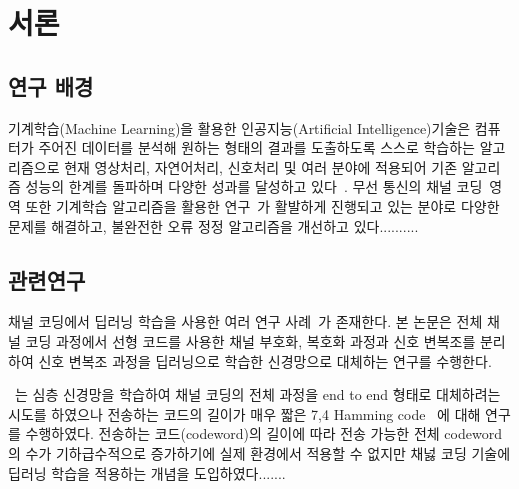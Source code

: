 \documentclass[11pt]{oblivoir}
\begin{document}

\makefrontcover
\myemptypage

\makefrontcover

\makeapproval

\tableofcontents
\listoffigures
\listoftables

\newpage

\section{\centering 서론}

\subsection{연구 배경}

기계학습(Machine Learning)을 활용한 인공지능(Artificial Intelligence)기술은 컴퓨터가 주어진 데이터를 분석해 원하는 형태의 결과를 도출하도록 스스로 학습하는 알고리즘으로 현재 영상처리, 자연어처리, 신호처리 및 여러 분야에 적용되어 기존 알고리즘 성능의 한계를 돌파하며 다양한 성과를 달성하고 있다~\cite{oshea--hoydis2017}. 무선 통신의 채널 코딩~\cite{faruque2016introduction}영역 또한 기계학습 알고리즘을 활용한 연구~\cite{Balevi--Andrews2020}가 활발하게 진행되고 있는 분야로 다양한 문제를 해결하고, 불완전한 오류 정정 알고리즘을 개선하고 있다..........

\subsection{관련연구}

채널 코딩에서 딥러닝 학습을 사용한 여러 연구 사례~\cite{oshea--hoydis2017,jiang--kim--asnani--kannan--oh--viswanath2020,kim2020,Shental2019,Koike-Akino--Wang--Millar--Kojima--Parsons2019}가 존재한다. 본 논문은 전체 채널 코딩 과정에서 선형 코드를 사용한 채널 부호화, 복호화 과정과 신호 변복조를 분리하여 신호 변복조 과정을 딥러닝으로 학습한 신경망으로 대체하는 연구를 수행한다.

~\cite{oshea--hoydis2017}는 심층 신경망을 학습하여 채널 코딩의 전체 과정을 end to end 형태로 대체하려는 시도를 하였으나 전송하는 코드의 길이가 매우 짧은 7,4 Hamming code~\cite{7955265} 에 대해 연구를 수행하였다. 전송하는 코드(codeword)의 길이에 따라 전송 가능한 전체 codeword의  수가 기하급수적으로 증가하기에 실제 환경에서 적용할 수 없지만 채넗 코딩 기술에 딥러닝 학습을 적용하는 개념을 도입하였다.......
\end{document}
